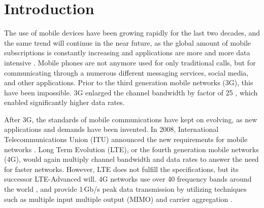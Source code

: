\section{Introduction}
\label{sec:introduction}

\thispagestyle{empty}

\begin{comment}
\begin{itemize}
\item[--]Tutkimuksen taustaa ja tutkimusaiheen yleisluonteinen esittely
\item[--]Tutkimuksen tavoitteet
\item[--]Pääkysymys ja osaongelmat
\item[--]Tutkimuksen rajaus ja keskeiset käsitteet.
\item[--]Työn rakenne
\end{itemize}
\end{comment}

The use of mobile devices have been growing rapidly for the last two decades, and the same trend will continue in the near future, as the global amount of mobile subscriptions is constantly increasing and applications are more and more data intensive \cite{nokia,cisco,ericsson,gsma}. Mobile phones are not anymore used for only traditional calls, but for communicating through a numerous different messaging services, social media, and other applications. Prior to the third generation mobile networks (3G), this have been impossible. 3G enlarged the channel bandwidth by factor of 25 \cite{molisch}, which enabled significantly higher data rates.

After 3G, the standards of mobile communications have kept on evolving, as new applications and demands have been invented. In 2008, International Telecommunications Union (ITU) announced the new requirements for mobile networks \cite{itur}. Long Term Evolution (LTE), or the fourth generation mobile networks (4G), would again multiply channel bandwidth and data rates to answer the need for faster networks. However, LTE does not fulfill the specifications, but its successor LTE-Advanced will. 4G networks use over 40 frequency bands around the world \cite{radio_electronics,molisch}, and provide 1\,Gb/s peak data transmission by utilizing techniques such as multiple input multiple output (MIMO) and carrier aggregation \cite{parkvall_lte}.

